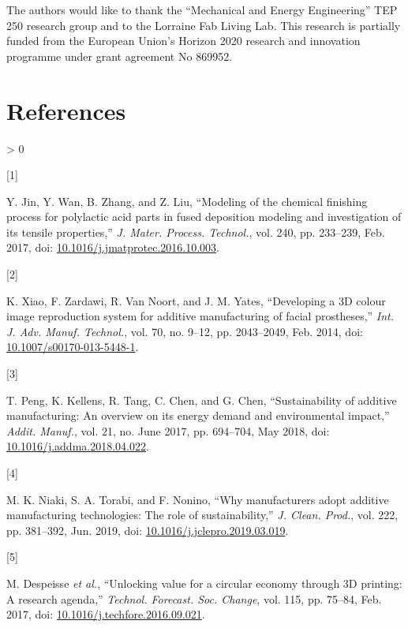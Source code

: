 \documentclass[conference,final,]{IEEEtran}
\newlength{\csllabelwidth}
\newlength{\cslhangindent}
\newenvironment{CSLReferences}[3] %
 {%
  \setlength{\parindent}{0pt}
  \ifodd #1 \everypar{\setlength{\hangindent}{\cslhangindent}}\ignorespaces\fi
  \ifnum #2 > 0
  \setlength{\parskip}{#2\baselineskip}
  \fi
 }%
 {}
\newcommand{\CSLLeftMargin}[1]{\parbox[t]{\csllabelwidth}{#1}}
\newcommand{\CSLRightInline}[1]{\parbox[t]{\linewidth - \csllabelwidth}{#1}}
\begin{document}
The authors would like to thank the ``Mechanical and Energy
Engineering'' TEP 250 research group and to the Lorraine Fab Living Lab.
This research is partially funded from the European Union's Horizon 2020
research and innovation programme under grant agreement No 869952.

\hypertarget{references}{%
\section*{References}\label{references}}

\hypertarget{refs}{}
\begin{CSLReferences}{0}{0}
\leavevmode\hypertarget{ref-Jin2017}{}%
\CSLLeftMargin{{[}1{]} }
\CSLRightInline{Y. Jin, Y. Wan, B. Zhang, and Z. Liu, {``{Modeling of
the chemical finishing process for polylactic acid parts in fused
deposition modeling and investigation of its tensile properties},''}
\emph{J. Mater. Process. Technol.}, vol. 240, pp. 233--239, Feb. 2017,
doi:
\href{https://doi.org/10.1016/j.jmatprotec.2016.10.003}{10.1016/j.jmatprotec.2016.10.003}.}

\leavevmode\hypertarget{ref-Xiao2014}{}%
\CSLLeftMargin{{[}2{]} }
\CSLRightInline{K. Xiao, F. Zardawi, R. Van Noort, and J. M. Yates,
{``{Developing a 3D colour image reproduction system for additive
manufacturing of facial prostheses},''} \emph{Int. J. Adv. Manuf.
Technol.}, vol. 70, no. 9--12, pp. 2043--2049, Feb. 2014, doi:
\href{https://doi.org/10.1007/s00170-013-5448-1}{10.1007/s00170-013-5448-1}.}

\leavevmode\hypertarget{ref-Peng2018}{}%
\CSLLeftMargin{{[}3{]} }
\CSLRightInline{T. Peng, K. Kellens, R. Tang, C. Chen, and G. Chen,
{``{Sustainability of additive manufacturing: An overview on its energy
demand and environmental impact},''} \emph{Addit. Manuf.}, vol. 21, no.
June 2017, pp. 694--704, May 2018, doi:
\href{https://doi.org/10.1016/j.addma.2018.04.022}{10.1016/j.addma.2018.04.022}.}

\leavevmode\hypertarget{ref-Niaki2019}{}%
\CSLLeftMargin{{[}4{]} }
\CSLRightInline{M. K. Niaki, S. A. Torabi, and F. Nonino, {``{Why
manufacturers adopt additive manufacturing technologies: The role of
sustainability},''} \emph{J. Clean. Prod.}, vol. 222, pp. 381--392, Jun.
2019, doi:
\href{https://doi.org/10.1016/j.jclepro.2019.03.019}{10.1016/j.jclepro.2019.03.019}.}

\leavevmode\hypertarget{ref-Despeisse2016}{}%
\CSLLeftMargin{{[}5{]} }
\CSLRightInline{M. Despeisse \emph{et al.}, {``{Unlocking value for a
circular economy through 3D printing: A research agenda},''}
\emph{Technol. Forecast. Soc. Change}, vol. 115, pp. 75--84, Feb. 2017,
doi:
\href{https://doi.org/10.1016/j.techfore.2016.09.021}{10.1016/j.techfore.2016.09.021}.}


\end{CSLReferences}
\end{document}
